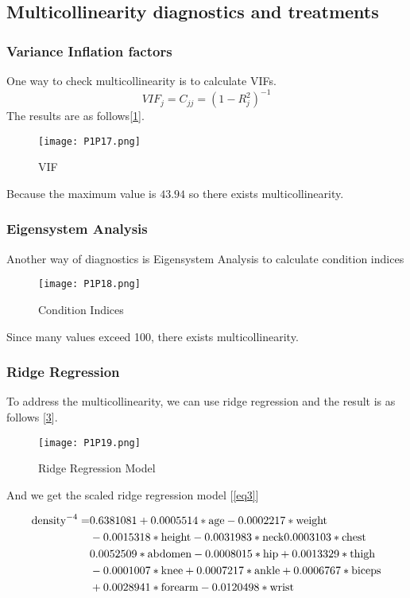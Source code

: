 \documentclass[11pt]{article}
\begin{document}
\subsection{Multicollinearity diagnostics and treatments}\label{ch5}

\subsubsection{Variance Inflation factors}


One way to check multicollinearity is to calculate VIFs.$$VIF_j=C_{jj}=(1-R_j^2)^{-1}$$The results are as follows[\ref{Fig14}].

\begin{figure}[!htb]
\centering
\texttt{[image: P1P17.png]}
\caption{VIF}\label{Fig14}
\end{figure}

Because the maximum value is $43.94$ so there exists multicollinearity.

\subsubsection{Eigensystem Analysis}

Another way of diagnostics is { Eigensystem Analysis} to calculate condition indices

\begin{figure}[!htb]
\centering
\texttt{[image: P1P18.png]}
\caption{Condition Indices}\label{Fig15}
\end{figure}

Since many values exceed 100, there exists multicollinearity.

\subsubsection{Ridge Regression}

To address the multicollinearity, we can use ridge regression and the result is as follows [\ref{Fig16}].

\begin{figure}[!htb]
\centering
\texttt{[image: P1P19.png]}
\caption{Ridge Regression Model}\label{Fig16}
\end{figure}

And we get the scaled ridge regression model [\ref{eq3}]
           
\begin{align}
	\text{density}^{-4} = &0.6381081+ 0.0005514 *\text{age}-0.0002217*\text{weight}\notag\\
	&-0.0015318*\text{height}-0.0031983*\text{neck}0.0003103*\text{chest}\notag\\
	&0.0052509*\text{abdomen}-0.0008015*\text{hip}+0.0013329*\text{thigh}\notag \\ 
    &-0.0001007*\text{knee} +0.0007217*\text{ankle}+0.0006767*\text{biceps}\notag\\
    & +0.0028941*\text{forearm}-0.0120498*\text{wrist}\label{eq3}  
\end{align}
\end{document}
